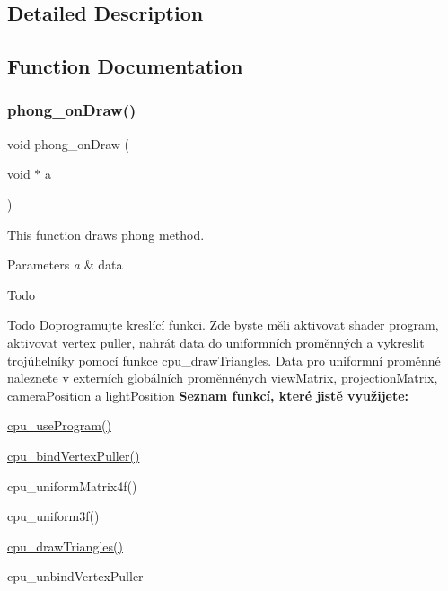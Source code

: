 \subsection{Detailed Description}


\subsection{Function Documentation}
\mbox{\label{group__cpu__side_ga077fd875cff025bec23bb738ac61278a}} 
\subsubsection{\texorpdfstring{phong\+\_\+on\+Draw()}{phong\_onDraw()}}
{\footnotesize\ttfamily void phong\+\_\+on\+Draw (\begin{DoxyParamCaption}\item[{void $\ast$}]{a }\end{DoxyParamCaption})}



This function draws phong method. 


\begin{DoxyParams}{Parameters}
{\em a} & data \\
\hline
\end{DoxyParams}
\begin{DoxyRefDesc}{Todo}
\item[\hyperlink{todo__todo000005}{Todo}]Doprogramujte kreslící funkci. Zde byste měli aktivovat shader program, aktivovat vertex puller, nahrát data do uniformních proměnných a vykreslit trojúhelníky pomocí funkce cpu\+\_\+draw\+Triangles. Data pro uniformní proměnné naleznete v externích globálních proměnnénych view\+Matrix, projection\+Matrix, camera\+Position a light\+Position {\bfseries Seznam funkcí, které jistě využijete\+:}
\begin{DoxyItemize}
\item \hyperlink{cpu_8c_abed0fbac42c4335409b29a19f13809f4}{cpu\+\_\+use\+Program()}
\item \hyperlink{cpu_8c_a18a87fa3883575459a9d12bd8c2c4fea}{cpu\+\_\+bind\+Vertex\+Puller()}
\item cpu\+\_\+uniform\+Matrix4f()
\item cpu\+\_\+uniform3f()
\item \hyperlink{cpu_8c_a13c52301446924ffbc425a07f8a14ed2}{cpu\+\_\+draw\+Triangles()}
\item cpu\+\_\+unbind\+Vertex\+Puller 
\end{DoxyItemize}\end{DoxyRefDesc}
\mbox{\label{group__cpu__side_gada78d4a6f5eb4c7cff394ae84b414e10}} 
